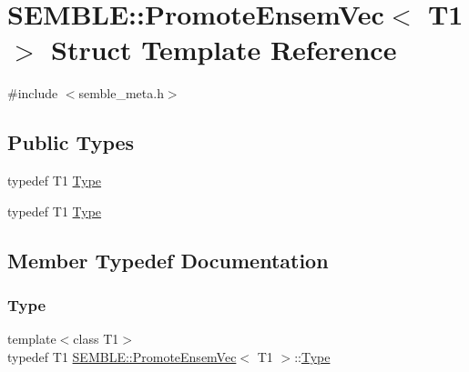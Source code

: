 \hypertarget{structSEMBLE_1_1PromoteEnsemVec}{}\section{S\+E\+M\+B\+LE\+:\+:Promote\+Ensem\+Vec$<$ T1 $>$ Struct Template Reference}
\label{structSEMBLE_1_1PromoteEnsemVec}


{\ttfamily \#include $<$semble\+\_\+meta.\+h$>$}

\subsection*{Public Types}
\begin{DoxyCompactItemize}
\item 
typedef T1 \mbox{\hyperlink{structSEMBLE_1_1PromoteEnsemVec_ab6dfb4c2ea4316822cd32c6cce09c9bd}{Type}}
\item 
typedef T1 \mbox{\hyperlink{structSEMBLE_1_1PromoteEnsemVec_ab6dfb4c2ea4316822cd32c6cce09c9bd}{Type}}
\end{DoxyCompactItemize}


\subsection{Member Typedef Documentation}
\mbox{\label{structSEMBLE_1_1PromoteEnsemVec_ab6dfb4c2ea4316822cd32c6cce09c9bd}} 
\subsubsection{\texorpdfstring{Type}{Type}\hspace{0.1cm}{\footnotesize\ttfamily [1/2]}}
{\footnotesize\ttfamily template$<$class T1$>$ \\
typedef T1 \mbox{\hyperlink{structSEMBLE_1_1PromoteEnsemVec}{S\+E\+M\+B\+L\+E\+::\+Promote\+Ensem\+Vec}}$<$ T1 $>$\+::\mbox{\hyperlink{structSEMBLE_1_1PromoteEnsemVec_ab6dfb4c2ea4316822cd32c6cce09c9bd}{Type}}}

\mbox{\label{structSEMBLE_1_1PromoteEnsemVec_ab6dfb4c2ea4316822cd32c6cce09c9bd}} 
